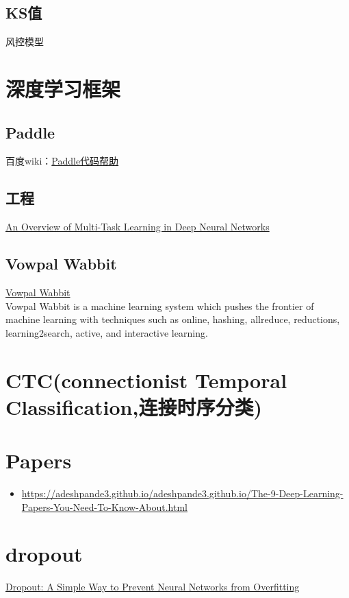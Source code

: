 \subsection{KS值}
风控模型

\section{深度学习框架}
\subsection{Paddle}
百度wiki：\href{http://wiki.baidu.com/pages/viewpage.action?pageId=38550738}{Paddle代码帮助}

\subsection{工程}
\href{http://ruder.io/multi-task/index.html}{An Overview of Multi-Task Learning in Deep Neural Networks}

\subsection{Vowpal Wabbit}
\href{https://github.com/JohnLangford/vowpal_wabbit}{Vowpal Wabbit}
\\Vowpal Wabbit is a machine learning system which pushes the frontier of machine learning with techniques such as online, hashing, allreduce, reductions, learning2search, active, and interactive learning.

\section{CTC(connectionist Temporal Classification,连接时序分类)}

\section{Papers}
\begin{itemize}
\item \href{The 9 Deep Learning Papers You Need To Know About (Understanding CNNs Part 3)}{https://adeshpande3.github.io/adeshpande3.github.io/The-9-Deep-Learning-Papers-You-Need-To-Know-About.html}
\end{itemize}


\section{dropout}
\href{https://www.cs.toronto.edu/~hinton/absps/JMLRdropout.pdf}{Dropout: A Simple Way to Prevent Neural Networks from Overfitting}


